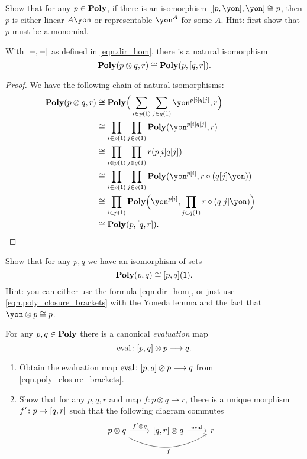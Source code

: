 \documentclass[Book-Poly]{subfiles}
\begin{document}
\begin{exercise}
Show that for any $p\in\textbf{Poly}$, if there is an isomorphism $\ihom{\ihom{p,\yon},\yon}\cong p$, then $p$ is either linear $A\yon$ or representable $\yon^A$ for some $A$. Hint: first show that $p$ must be a monomial.
\end{exercise}

\begin{proposition}\label{prop.dirichlet_closure}
With $[-,-]$ as defined in \eqref{eqn.dir_hom}, there is a natural isomorphism
\begin{equation}\label{eqn.poly_closure_brackets}
	\textbf{Poly}(p\otimes q,r)\cong\textbf{Poly}(p,[q,r]).
\end{equation}
\end{proposition}
\begin{proof}
We have the following chain of natural isomorphisms:
\begin{align*}
	\poly(p\otimes q,r)&\cong
	\poly\Big(\sum_{i\in p(\1)}\sum_{j\in q(\1)}\yon^{p[i]q[j]},r\Big)\\&\cong
	\prod_{i\in p(\1)}\prod_{j\in q(\1)}\poly(\yon^{p[i]q[j]},r)\\&\cong
	\prod_{i\in p(\1)}\prod_{j\in q(\1)}r(p[i]q[j])\\&\cong
	\prod_{i\in p(\1)}\prod_{j\in q(\1)}\poly(\yon^{p[i]},r\circ(q[j]\yon))\\&\cong
	\prod_{i\in p(\1)}\poly\Big(\yon^{p[i]},\prod_{j\in q(\1)}r\circ(q[j]\yon)\Big)\\&\cong
	\poly(p,\ihom{q,r}).&
	\qedhere
\end{align*}
\end{proof}

\begin{exercise}\label{exc.poly_plug_1}
Show that for any $p,q$ we have an isomorphism of sets
\[
\textbf{Poly}(p,q)\cong[p,q](\textsf{1}).
\]
Hint: you can either use the formula \eqref{eqn.dir_hom}, or just use 
\eqref{eqn.poly_closure_brackets} with the Yoneda lemma and the fact that $\yon\otimes p\cong p$.
\end{exercise}


For any $p,q\in\textbf{Poly}$ there is a canonical \emph{evaluation} map
\begin{equation}\label{eqn.eval_dirichlet}
  \mathrm{eval}\colon [p,q]\otimes p\longrightarrow q.
\end{equation}

\begin{exercise}
\begin{enumerate}
	\item Obtain the evaluation map $\mathrm{eval}\colon [p,q]\otimes p\longrightarrow q$ from \eqref{eqn.poly_closure_brackets}.
	\item Show that for any $p,q,r$ and map $f\colon p\otimes q\to r$, there is a unique morphism $f'\colon p\to[q,r]$ such that the following diagram commutes
	\[
	\begin{tikzcd}
		p\otimes q\ar[r, "f'\otimes q"]\ar[rr, bend right, "f"']&
		{\ihom{q,r}}\otimes q\ar[r, "\fun{eval}"]&
		r
	\end{tikzcd}
	\]
\qedhere
\end{enumerate}
\end{exercise}
\end{document}
